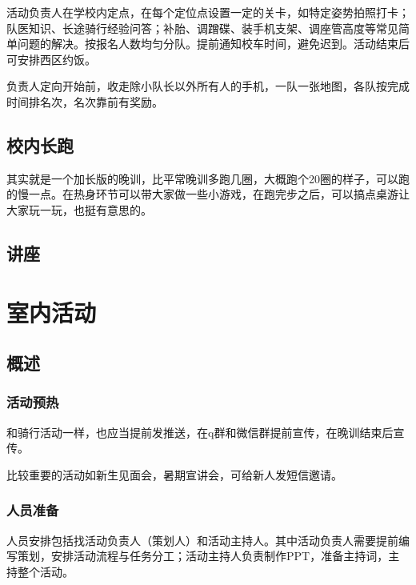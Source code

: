 \documentclass{ctexbook}
\begin{document}
活动负责人在学校内定点，在每个定位点设置一定的关卡，如特定姿势拍照打卡；队医知识、长途骑行经验问答；补胎、调蹭碟、装手机支架、调座管高度等常见简单问题的解决。按报名人数均匀分队。提前通知校车时间，避免迟到。活动结束后可安排西区约饭。

负责人定向开始前，收走除小队长以外所有人的手机，一队一张地图，各队按完成时间排名次，名次靠前有奖励。
\subsection{校内长跑}
其实就是一个加长版的晚训，比平常晚训多跑几圈，大概跑个20圈的样子，可以跑的慢一点。在热身环节可以带大家做一些小游戏，在跑完步之后，可以搞点桌游让大家玩一玩，也挺有意思的。
\subsection{讲座}
\section{室内活动}
\subsection{概述}
\subsubsection{活动预热}
和骑行活动一样，也应当提前发推送，在q群和微信群提前宣传，在晚训结束后宣传。

比较重要的活动如新生见面会，暑期宣讲会，可给新人发短信邀请。

\subsubsection{人员准备}
人员安排包括找活动负责人（策划人）和活动主持人。其中活动负责人需要提前编写策划，安排活动流程与任务分工；活动主持人负责制作PPT，准备主持词，主持整个活动。
\end{document}
